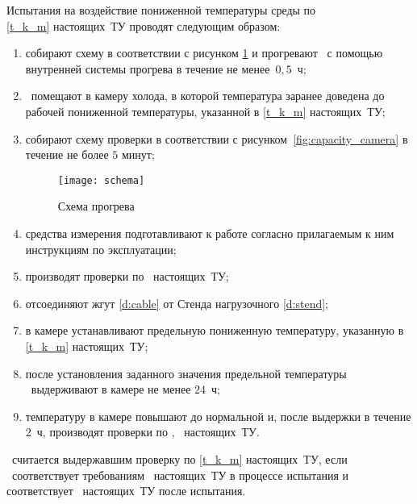 Испытания на воздействие пониженной температуры среды по \\ \ref{t_k_m} настоящих~ТУ проводят следующим образом:
%
\begin{enumerate}
	\item собирают схему в соответствии с рисунком \ref{fig:preheat} и прогревают \dut \ с помощью внутренней системы прогрева в течение не менее~$0,5$~ч;
	\item \dut \ помещают в камеру холода, в которой температура заранее доведена до рабочей пониженной температуры, указанной в \ref{t_k_m} настоящих~ТУ; 
	\item собирают схему проверки в соответствии с рисунком~\ref{fig:capacity_camera} в течение не более $5$ минут;
%
		\begin{figure}[!htb]
			\centering
			\texttt{[image: schema]}
			\begin{picdescription}
				\item \ESKDtheTitle \ \RN;
			\end{picdescription}
			\begin{picdescription}[label={E\arabic* ---}, ref={E\arabic*}, before={\vspace{0pt}\small}]
				\item\label{d:preheat} \hyperref[e:preheat]{Жгут \preheatRN}.
			\end{picdescription}
			\caption{Схема прогрева \dut \ }
			\label{fig:preheat}
		\end{figure}
%
	\item средства измерения подготавливают к работе согласно прилагаемым к ним инструкциям по эксплуатации;
	\item производят проверки по \treb \ настоящих~ТУ;
	\item отсоединяют жгут \ref{d:cable} от Стенда нагрузочного \ref{d:stend};
	\item в камере устанавливают предельную пониженную температуру, указанную в \ref{t_k_m} настоящих~ТУ;
	\item после установления заданного значения предельной температуры  \dut \ выдерживают в камере не менее $24$~ч;
	\item температуру в камере повышают до нормальной и, после выдержки в течение $2$~ч, производят проверки по \treb, \trebafter \ настоящих~ТУ.
\end{enumerate}

\dut \ считается выдержавшим проверку по \ref{t_k_m} настоящих~ТУ, если \dut \ соответствует требованиям \treb \ настоящих~ТУ в процессе испытания и соответствует \trebafter \ настоящих~ТУ после испытания.